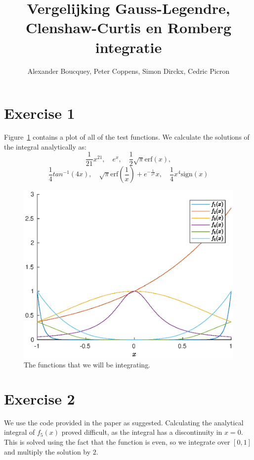 \documentclass{article}
\title{Vergelijking Gauss-Legendre, Clenshaw-Curtis en Romberg
integratie}
\author{Alexander Boucquey, Peter Coppens, Simon Dirckx, Cedric Picron}
\date{}
\begin{document}
\maketitle

\section{Exercise 1}

Figure~\ref{fig:f} contains a plot of all of the test functions.
We calculate the solutions of the integral analytically as:
\begin{equation}
\frac{1}{21} x^{21}, \quad e^x, \quad \frac{1}{2} \sqrt{\pi} \text{erf}(x),
\end{equation}
\begin{equation}
\frac{1}{4} tan^{-1}(4x), \quad \sqrt{\pi} \text{erf}(\frac{1}{x}) + e^{-\frac{1}{x^2}} x, \quad \frac{1}{4} x^4 \text{sign}(x)
\end{equation}

\begin{figure}[H]
\includegraphics[width=0.7\linewidth]{f.eps}
\centering
\caption{The functions that we will be integrating.} \label{fig:f}
\end{figure}

\pagebreak
\section{Exercise 2}

We use the code provided in the paper as suggested. Calculating the analytical integral of $f_5(x)$ proved difficult, as the integral has a discontinuity in $x=0$. This is solved using the fact that the function is even, so we integrate over $\left[0, 1\right]$ and multiply the solution by $2$. \\
\end{document}
